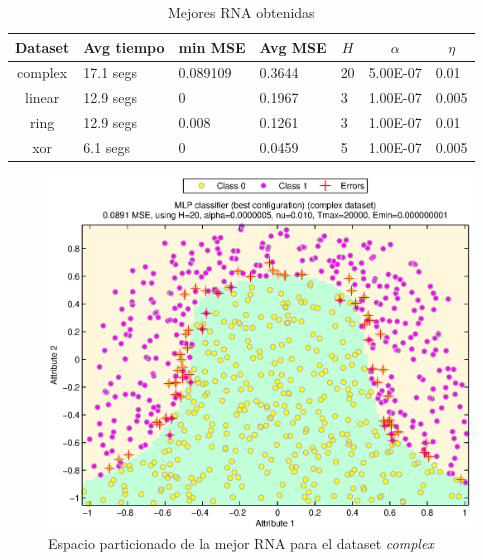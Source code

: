 \documentclass[journal]{IEEEtran}
\begin{document}
\begin{table}[h]
\centering
\begin{tabular}{@{}cllllll@{}}
\toprule
\textbf{Dataset} & \multicolumn{1}{c}{\textbf{Avg tiempo}} & \multicolumn{1}{c}{\textbf{min MSE}} & \multicolumn{1}{c}{\textbf{Avg MSE}} & \multicolumn{1}{c}{\textbf{$H$}} & \multicolumn{1}{c}{\textbf{$\alpha$}} & \multicolumn{1}{c}{\textbf{$\eta$}} \\ \midrule
complex          & 17.1 segs                               & 0.089109                               & 0.3644                                    & 20                             & 5.00E-07                           & 0.01                            \\
linear           & 12.9 segs                               & 0                                      & 0.1967                                    & 3                              & 1.00E-07                           & 0.005                           \\
ring             & 12.9 segs                               & 0.008                                  & 0.1261                                    & 3                              & 1.00E-07                           & 0.01                            \\
xor              & 6.1 segs                                & 0                                      & 0.0459                                    & 5                              & 1.00E-07                           & 0.005                           \\ \bottomrule
\end{tabular}
\caption{Mejores RNA obtenidas}
\label{tab:best-rna}
\end{table}

\begin{figure}[tb]
	\centering
	\includegraphics[width=\columnwidth]{imagenes/complex}
	\caption{Espacio particionado de la mejor RNA para el dataset \emph{complex}}
	\label{fig:espacio-particionado-complex}
\end{figure}
\end{document}
